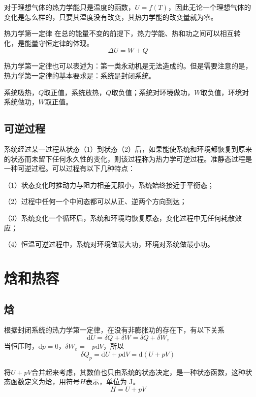 \documentclass[lang=cn,newtx,10pt,scheme=chinese]{elegantbook}
\begin{document}
对于理想气体的热力学能只是温度的函数，$U=f(T)$，因此无论一个理想气体的变化是怎么样的，只要其温度没有改变，其热力学能的改变量就为零。

\begin{theorem}{热力学第一定律}
	在总的能量不变的前提下，热力学能、热和功之间可以相互转化，是能量守恒定律的体现。
	\begin{equation}
		\Delta U = W+Q
	\end{equation}

热力学第一定律也可以表述为：第一类永动机是无法造成的。但是需要注意的是，热力学第一定律的基本要求是：系统是封闭系统。
\end{theorem}

系统吸热，$Q$取正值，系统放热，$Q$取负值；系统对环境做功，$W$取负值，环境对系统做功，$W$取正值。

\subsection{可逆过程}
系统经过某一过程从状态（1）到状态（2）后，如果能使系统和环境都恢复到原来的状态而未留下任何永久性的变化，则该过程称为热力学可逆过程。准静态过程是一种可逆过程。可以过程有以下几种特点：

（1）状态变化时推动力与阻力相差无限小，系统始终接近于平衡态；

（2）过程中任何一个中间态都可以从正、逆两个方向到达；

（3）系统变化一个循环后，系统和环境均恢复原态，变化过程中无任何耗散效应；

（4）恒温可逆过程中，系统对环境做最大功，环境对系统做最小功。

\section{焓和热容}

\subsection{焓}
根据封闭系统的热力学第一定律，在没有非膨胀功的存在下，有以下关系
$$
\mathrm{d}U=\delta Q+ \delta W = \delta Q + \delta W_e
$$
当恒压时，$\mathrm{d}p=0$，$\delta W_e = -p\mathrm{d}V$，所以
$$
\delta Q_p = \mathrm{d}U + p\mathrm{d}V = \mathrm{d}(U+pV)
$$

将$U+pV$合并起来考虑，其数值也只由系统的状态决定，是一种状态函数，这种状态函数定义为焓，用符号$H$表示，单位为 J。
\begin{equation}
	H=U+pV
\end{equation}
\end{document}
